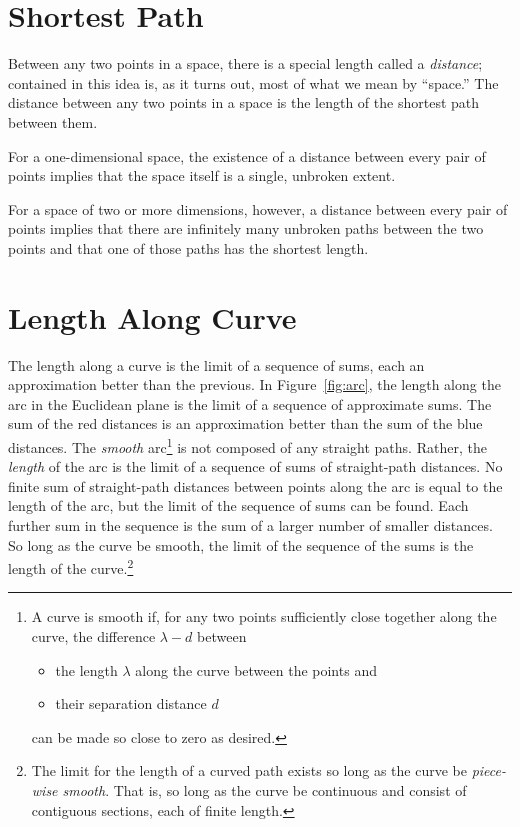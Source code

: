 \section{Shortest Path}

Between any two points in a space, there is a special length called a
\emph{distance}; contained in this idea is, as it turns out, most of what we
mean by ``space.'' The distance between any two points in a space is the length
of the shortest path between them.

For a one-dimensional space, the existence of a distance between every pair of
points implies that the space itself is a single, unbroken extent.

For a space of two or more dimensions, however, a distance between every pair
of points implies that there are infinitely many unbroken paths between the two
points and that one of those paths has the shortest length.

\section{Length Along Curve}

The length along a curve is the limit of a sequence of sums, each an
approximation better than the previous.  In Figure~\ref{fig:arc}, the length
along the arc in the Euclidean plane is the limit of a sequence of approximate
sums.  The sum of the red distances is an approximation better than the sum of
the blue distances.  The \emph{smooth} arc\footnote{%
   A curve is smooth if, for any two points sufficiently close together along
   the curve, the difference $\lambda - d$ between
   \begin{itemize}[noitemsep]
      \item the length $\lambda$ along the curve between the points and
      \item their separation distance $d$
   \end{itemize}
   can be made so close to zero as desired.%
}
is not composed of any straight paths.  Rather, the \emph{length} of the arc is
the limit of a sequence of sums of straight-path distances.  No finite sum of
straight-path distances between points along the arc is equal to the length of
the arc, but the limit of the sequence of sums can be found.  Each further sum
in the sequence is the sum of a larger number of smaller distances.  So long as
the curve be smooth, the limit of the sequence of the sums is the length of the
curve.\footnote{%
   The limit for the length of a curved path exists so long as the curve be
   \emph{piece-wise smooth}.  That is, so long as the curve be continuous and
   consist of contiguous sections, each of finite length.%
}

